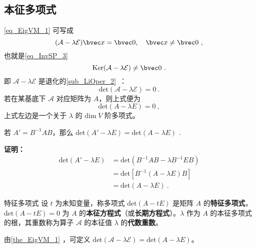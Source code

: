 \subsection{本征多项式}
\autoref{eq_EigVM_1} 可写成
\begin{equation}
(\mathcal{A-\lambda E})\bvec x=\bvec 0,\quad \bvec x\neq\bvec 0~,
\end{equation}
也就是\autoref{eq_InvSP_3}~ 
\begin{equation}
\mathrm{Ker(\mathcal{A}-\lambda\mathcal{E})}\neq\bvec 0~.
\end{equation}
即 $\mathcal{A-\lambda E}$ 是退化的\autoref{sub_LiOper_2}~：
\begin{equation}
\mathrm{det}(\mathcal{A-\lambda E})=0~.
\end{equation}
若在某基底下 $\mathcal{A}$ 对应矩阵为 $A$，则上式便为
\begin{equation}\label{eq_EigVM_2}
\mathrm{det}(A-\lambda E)=0~,
\end{equation}
上式左边是一个关于 $\lambda$ 的 $\mathrm{dim}\;{V}$ 阶多项式。
\begin{theorem}{}\label{the_EigVM_1}
若 $A'=B^{-1}AB$，那么 $\mathrm{det}(A'-\lambda E)=\mathrm{det}(A-\lambda E)$ .
\end{theorem}
\textbf{证明：}
\begin{equation}
\begin{aligned}
\mathrm{det}(A'-\lambda E)&=\mathrm{det}(B^{-1}AB-\lambda B^{-1}EB)\\
&=\mathrm{det}[B^{-1}(A-\lambda E)B]\\
&=\mathrm{det}(A-\lambda E)~.
\end{aligned}
\end{equation}
\begin{definition}{特征多项式}
设 $t$ 为未知变量，称多项式 $\mathrm{det}(A-tE)$ 是矩阵 $A$ 的\textbf{特征多项式}，$\mathrm{det}(A-tE)=0$ 为 $A$ 的\textbf{本征方程式}（或\textbf{长期方程式}）。$\lambda$ 作为 $A$ 的本征多项式的根，其重数称为算子 $\mathcal{A}$ 的本征值 $\lambda$ 的\textbf{代数重数}。
\end{definition}
由\autoref{the_EigVM_1} ，可定义 $\mathrm{det}(\mathcal{A-\lambda E})=\mathrm{det}(A-\lambda E)$。
